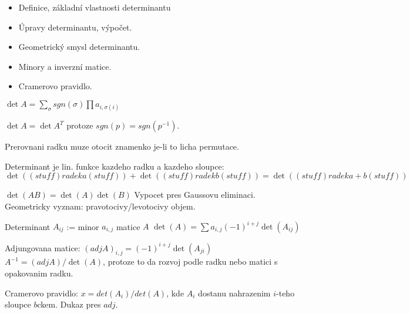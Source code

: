 \begin{itemize}
\item Definice, základní vlastnosti determinantu
\item Úpravy determinantu, výpočet.
\item Geometrický smysl determinantu.
\item Minory a inverzní matice.
\item Cramerovo pravidlo.
\end{itemize}

$\det A=\sum_{\sigma} sgn(\sigma)\prod a_{i,\sigma(i)}$

$\det A=\det A^T$ protoze $sgn(p)=sgn(p^{-1})$.

Prerovnani radku muze otocit znamenko je-li to licha permutace.

Determinant je lin. funkce kazdeho radku a kazdeho sloupce:
$\det((stuff) radek a (stuff))+\det((stuff) radek b (stuff))=\det((stuff) radek
a+b (stuff))$

$\det(AB)=\det(A)\det(B)$
Vypocet pres Gaussovu eliminaci.
Geometricky vyznam: pravotocivy/levotocivy objem.

Determinant $A_{ij}$ := minor $a_{i,j}$ matice $A$
$\det(A)=\sum a_{i,j}(-1)^{i+j}\det(A_{ij})$

Adjungovana matice: $(adj A)_{i,j}=(-1)^{i+j}\det(A_{ji})$
$A^{-1}=(adj A)/\det(A)$, protoze to da rozvoj podle radku nebo matici
s opakovanim radku.

Cramerovo pravidlo: $x=det(A_i)/det(A)$, kde $A_i$ dostanu nahrazenim $i$-teho
sloupce $b$ckem. Dukaz pres $adj$.
